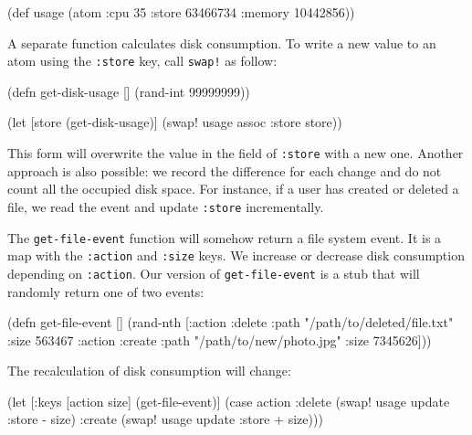 \begin{english}
  \begin{clojure}
(def usage
  (atom {:cpu 35
         :store 63466734
         :memory 10442856}))
  \end{clojure}
\end{english}

A separate function calculates disk consumption.
To write a new value to an atom using the \verb|:store| key, call \verb|swap!| as follow:

\begin{english}
  \begin{clojure}
(defn get-disk-usage []
  (rand-int 99999999))

(let [store (get-disk-usage)]
  (swap! usage assoc :store store))
  \end{clojure}
\end{english}

This form will overwrite the value in the field of \verb|:store| with a new one. Another approach is also possible: we record the difference for each change and do not count all the occupied disk space.
For instance, if a user has created or deleted a file, we read the event and update \verb|:store| incrementally.

The \verb|get-file-event| function will somehow return a file system event.
It is a map with the \verb|:action| and \verb|:size| keys.
We increase or decrease disk consumption depending on \verb|:action|.
Our version of \texttt{get-file\--event} is a stub that will randomly return one of two events:

\begin{english}
  \begin{clojure}
(defn get-file-event []
  (rand-nth
   [{:action :delete
     :path "/path/to/deleted/file.txt"
     :size 563467}
    {:action :create
     :path "/path/to/new/photo.jpg"
     :size 7345626}]))
  \end{clojure}
\end{english}

\noindent
The recalculation of disk consumption will change:

\ifx\DEVICETYPE\MOBILE

\begin{english}
  \begin{clojure}
(let [{:keys [action size]}
      (get-file-event)]
  (case action
    :delete
    (swap! usage update :store - size)
    :create
    (swap! usage update :store + size)))
  \end{clojure}
\end{english}

